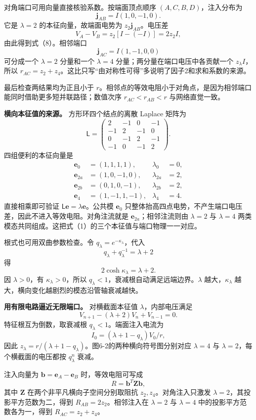 \documentclass[12pt,a4paper,UTF8]{ctexart}
\begin{document}
对角端口可用向量直接核验系数。按端面顶点顺序 \((A,C,B,D)\)，注入分布为
\[
\boldsymbol j_{AB}=I(1,0,-1,0).
\] 它是 \(\lambda=2\) 的本征向量，故端面电势为
\(z_2\boldsymbol j_{AB}\)。电压差 \[
V_A-V_B=z_2[I-(-I)]=2z_2I,
\] 由此得到式（8）。相邻端口 \[
\boldsymbol j_{AC}=I(1,-1,0,0)
\] 可分成一个 \(\lambda=2\) 分量和一个 \(\lambda=4\)
分量；两分量在端口电压中各贡献一个 \(z_\lambda I\)，所以
\(r_{AC}=z_2+z_4\)。这比只写``由对称性可得''多说明了因子2和求和系数的来源。

最后检查两结果均为正且小于
\(r\)。相邻点的等效电阻小于对角点，是因为相邻端口能同时借助更多短并联路径；数值次序
\(r_{AC}<r_{AB}<r\) 与网络直觉一致。

\textbf{横向本征值的来源。} 方形环四个结点的离散 Laplace 矩阵为 \[
\mathsf L=
\begin{pmatrix}
2&-1&0&-1\\
-1&2&-1&0\\
0&-1&2&-1\\
-1&0&-1&2
\end{pmatrix}.
\] 四组便利的本征向量是 \[
\begin{aligned}
\boldsymbol e_0&=(1,1,1,1),&\lambda_0&=0,\\
\boldsymbol e_{2a}&=(1,0,-1,0),&\lambda_{2a}&=2,\\
\boldsymbol e_{2b}&=(0,1,0,-1),&\lambda_{2b}&=2,\\
\boldsymbol e_4&=(1,-1,1,-1),&\lambda_4&=4.
\end{aligned}
\] 直接相乘即可验证
\(\mathsf L\boldsymbol e=\lambda\boldsymbol e\)。公共模
\(\boldsymbol e_0\)
只整体抬高四点电势，不产生端口电压差，因此不进入等效电阻。对角注流就是
\(\boldsymbol e_{2a}\)；相邻注流则由 \(\lambda=2\) 与 \(\lambda=4\)
两类模态共同组成。这把式（1）的三个本征值与端口物理一一对应。

根式也可用双曲参数检查。令 \(q_\lambda=e^{-\kappa_\lambda}\)，代入 \[
q_\lambda+q_\lambda^{-1}=\lambda+2
\] 得 \[
2\cosh\kappa_\lambda=\lambda+2.
\] 因 \(\lambda>0\)，有 \(\kappa_\lambda>0\)，所以
\(q_\lambda<1\)，衰减根自动满足远端边界。\(\lambda\)
越大，\(\kappa_\lambda\) 越大，横向变化越剧烈的模态沿管轴衰减越快。

\textbf{用有限电路逼近无限端口。} 对横截面本征值
\(\lambda\)，内部电压满足 \[
V_{n+1}-(\lambda+2)V_n+V_{n-1}=0.
\] 特征根互为倒数，取衰减根 \(q_\lambda<1\)。端面注入电流为 \[
I_0=(\lambda+1-q_\lambda)V_0/r,
\] 因此
\(z_\lambda=r/(\lambda+1-q_\lambda)\)。图6-2的两种横向符号图分别对应
\(\lambda=4\) 与 \(\lambda=2\)，每个横截面的电压都按 \(q_\lambda^n\)
衰减。

注入向量为 \(\bm b=\bm e_A-\bm e_B\) 时，等效电阻可写成 \[
R=\bm b^T\bm Z\bm b,
\] 其中 \(\bm Z\) 在两个非平凡横向子空间分别取阻抗
\(z_2,z_4\)。对角注入只激发 \(\lambda=2\)，其投影平方范数为二，得到
\(R_{AB}=2z_2\)。相邻注入在 \(\lambda=2\) 与 \(\lambda=4\)
中的投影平方范数各为一，得到 \(R_{AC}=z_2+z_4\)。
\end{document}

